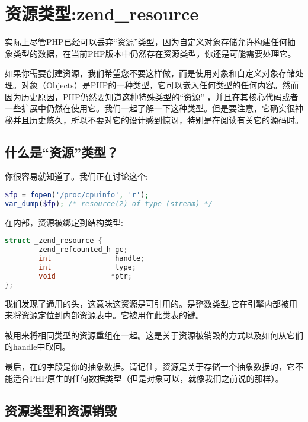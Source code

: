 \section{资源类型:zend\_resource}
\label{sec:zend_resource}

实际上尽管PHP已经可以丢弃“资源”类型，因为自定义对象存储允许构建任何抽象类型的数据，在当前PHP版本中仍然存在资源类型，你还是可能需要处理它。

如果你需要创建资源，我们希望您不要这样做，而是使用对象和自定义对象存储处理。对象（Objects）是PHP的一种类型，它可以嵌入任何类型的任何内容。然而因为历史原因，PHP仍然要知道这种特殊类型的“资源” ，并且在其核心代码或者一些扩展中仍然在使用它。我们一起了解一下这种类型。但是要注意，它确实很神秘并且历史悠久，所以不要对它的设计感到惊讶，特别是在阅读有关它的源码时。

\subsection{什么是“资源”类型？}

你很容易就知道了。我们正在讨论这个:

\begin{lstlisting}[language=php]
$fp = fopen('/proc/cpuinfo', 'r');
var_dump($fp); /* resource(2) of type (stream) */
\end{lstlisting}

在内部，资源被绑定到结构类型:

\begin{lstlisting}[language=c]
struct _zend_resource {
        zend_refcounted_h gc;
        int               handle;
        int               type;
        void             *ptr;
};
\end{lstlisting}

我们发现了通用的头，这意味这资源是可引用的。是整数类型,它在引擎内部被用来将资源定位到内部资源表中。它被用作此类表的键。

被用来将相同类型的资源重组在一起。这是关于资源被销毁的方式以及如何从它们的handle中取回。

最后，在的字段是你的抽象数据。请记住，资源是关于存储一个抽象数据的，它不能适合PHP原生的任何数据类型（但是对象可以，就像我们之前说的那样）。

\subsection{资源类型和资源销毁}

